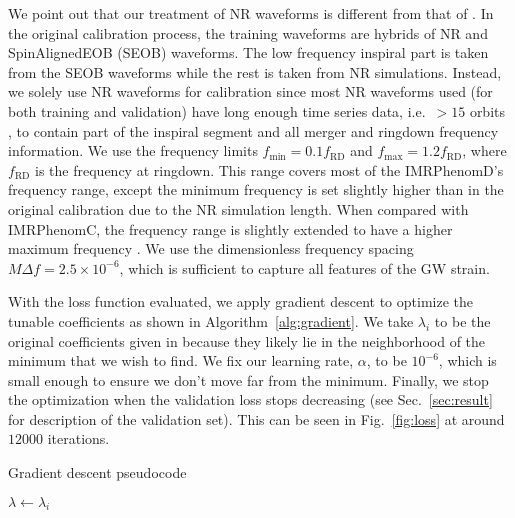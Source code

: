 \documentclass[twocolumn]{aastex631}
\begin{document}
We point out that our treatment of NR waveforms is different from that of \citep{husa2016frequency, khan2016frequency}.
In the original calibration process, the training waveforms are hybrids of NR and SpinAlignedEOB (SEOB) waveforms.
The low frequency inspiral part is taken from the SEOB
waveforms while the rest is taken from NR simulations.
Instead, we solely use NR waveforms for calibration since most NR waveforms used (for both training and validation)
have long enough time series data, i.e.~$>15$ orbits \citep{boyle2019sxs}, to contain part of the inspiral segment and all
merger and ringdown frequency information. We use the frequency limits
$f_{\mathrm{min}}=0.1f_{\mathrm{RD}}$ and $f_{\mathrm{max}}=1.2f_{\mathrm{RD}}$,	
where $f_{\mathrm{RD}}$ is the frequency at ringdown. This range covers most of
the IMRPhenomD's frequency range, except the minimum frequency is set slightly higher
than in the original calibration due to the NR simulation length.
When compared with IMRPhenomC, the frequency range is slightly extended to have a higher maximum
frequency \citep{santamaria2010matching}.
We use the dimensionless frequency spacing $M\Delta f=2.5\times10^{-6}$, 
which is sufficient to capture all features of the GW strain. 


With the loss function evaluated, we apply gradient descent to optimize the tunable
coefficients as shown in Algorithm~\ref{alg:gradient}. We take $\lambda_i$ to be the 
original coefficients given in \citep{khan2016frequency} because they likely lie in the
neighborhood of the minimum that we wish to find. 
We fix our learning rate, $\alpha$, to be $10^{-6}$, which is small enough to ensure we 
don't move far from the minimum.
Finally, we stop the optimization when the validation loss stops decreasing 
(see Sec.~\ref{sec:result} for description of the validation set).
This can be seen in Fig.~\ref{fig:loss} at around $12000$ iterations.

\begin{algorithm}[t]
	\caption{Gradient descent pseudocode}
	\label{alg:gradient}
	    $\lambda\leftarrow\lambda_i$\\
	 \Return{$\lambda$}
\end{algorithm}
\end{document}
